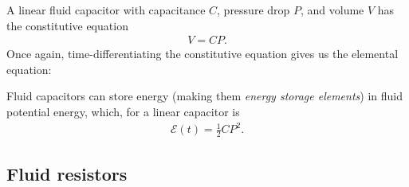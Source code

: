 \documentclass[dynamic_systems.tex]{subfiles}
\begin{document}
A linear fluid capacitor with capacitance $C$, pressure drop $P$, and volume $V$ has the constitutive equation
\begin{align}
	V = C P.
\end{align}
Once again, time-differentiating the constitutive equation gives us the elemental equation:

Fluid capacitors can store energy (making them \emph{energy storage elements}) in fluid potential energy, which, for a linear capacitor is
\begin{align}
	\mathcal{E}(t) = \frac{1}{2} C P^2.
\end{align}

\subsection{Fluid resistors}
\tags{}

\end{document}
